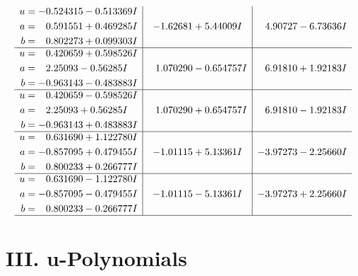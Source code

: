 \documentclass[1p]{elsarticle_modified}
\theoremstyle{definition}
\begin{document}
$$\begin{array}{c|c|c}
\begin{aligned}
u &= -0.524315 - 0.513369 I \\
a &= \phantom{-}0.591551 + 0.469285 I \\
b &= \phantom{-}0.802273 + 0.099303 I\end{aligned}
 & -1.62681 + 5.44009 I & \phantom{-}4.90727 - 6.73636 I \\ \hline\begin{aligned}
u &= \phantom{-}0.420659 + 0.598526 I \\
a &= \phantom{-}2.25093 - 0.56285 I \\
b &= -0.963143 - 0.483883 I\end{aligned}
 & \phantom{-}1.070290 - 0.654757 I & \phantom{-}6.91810 + 1.92183 I \\ \hline\begin{aligned}
u &= \phantom{-}0.420659 - 0.598526 I \\
a &= \phantom{-}2.25093 + 0.56285 I \\
b &= -0.963143 + 0.483883 I\end{aligned}
 & \phantom{-}1.070290 + 0.654757 I & \phantom{-}6.91810 - 1.92183 I \\ \hline\begin{aligned}
u &= \phantom{-}0.631690 + 1.122780 I \\
a &= -0.857095 + 0.479455 I \\
b &= \phantom{-}0.800233 + 0.266777 I\end{aligned}
 & -1.01115 + 5.13361 I & -3.97273 - 2.25660 I \\ \hline\begin{aligned}
u &= \phantom{-}0.631690 - 1.122780 I \\
a &= -0.857095 - 0.479455 I \\
b &= \phantom{-}0.800233 - 0.266777 I\end{aligned}
 & -1.01115 - 5.13361 I & -3.97273 + 2.25660 I\\
 \hline 
 \end{array}$$\newpage
\newpage\renewcommand{\arraystretch}{1}
\centering \section*{ III. u-Polynomials}
\end{document}
